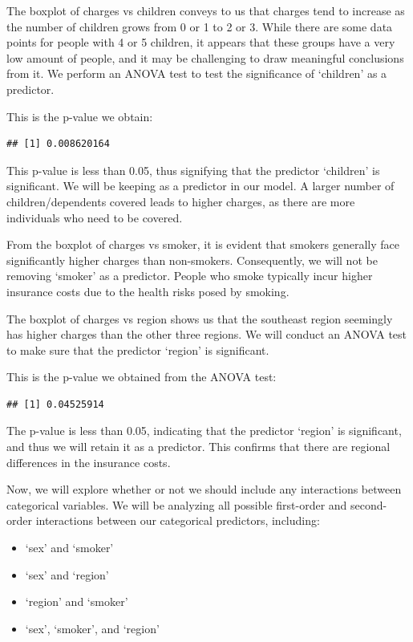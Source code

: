 \documentclass[
  12pt,
]{article}
\providecommand{\tightlist}{%
  \setlength{\itemsep}{0pt}\setlength{\parskip}{0pt}}
\begin{document}
The boxplot of charges vs children conveys to us that charges tend to
increase as the number of children grows from 0 or 1 to 2 or 3. While
there are some data points for people with 4 or 5 children, it appears
that these groups have a very low amount of people, and it may be
challenging to draw meaningful conclusions from it. We perform an ANOVA
test to test the significance of `children' as a predictor.

This is the p-value we obtain:

\begin{verbatim}
## [1] 0.008620164
\end{verbatim}

This p-value is less than 0.05, thus signifying that the predictor
`children' is significant. We will be keeping as a predictor in our
model. A larger number of children/dependents covered leads to higher
charges, as there are more individuals who need to be covered.

From the boxplot of charges vs smoker, it is evident that smokers
generally face significantly higher charges than non-smokers.
Consequently, we will not be removing `smoker' as a predictor. People
who smoke typically incur higher insurance costs due to the health risks
posed by smoking.

The boxplot of charges vs region shows us that the southeast region
seemingly has higher charges than the other three regions. We will
conduct an ANOVA test to make sure that the predictor `region' is
significant.

This is the p-value we obtained from the ANOVA test:

\begin{verbatim}
## [1] 0.04525914
\end{verbatim}

The p-value is less than 0.05, indicating that the predictor `region' is
significant, and thus we will retain it as a predictor. This confirms
that there are regional differences in the insurance costs.

\newpage

Now, we will explore whether or not we should include any interactions
between categorical variables. We will be analyzing all possible
first-order and second-order interactions between our categorical
predictors, including:

\begin{itemize}
\tightlist
\item
  `sex' and `smoker'
\item
  `sex' and `region'
\item
  `region' and `smoker'
\item
  `sex', `smoker', and `region'
\end{itemize}
\end{document}
